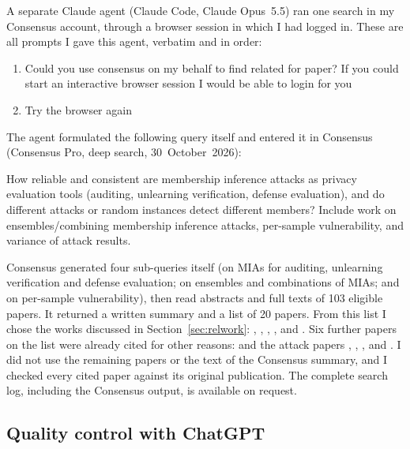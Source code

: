 \documentclass[a4paper]{article}
\newcommand{\prompt}[1]{{\raggedright\small\ttfamily\frenchspacing #1\par}}
\begin{document}
A separate Claude agent (Claude Code, Claude Opus~5.5) ran one search in my Consensus account, through a browser session in which I had logged in. These are all prompts I gave this agent, verbatim and in order:
\begin{enumerate}
  \item \prompt{Could you use consensus on my behalf to find related for paper? If you could start an interactive browser session I would be able to login for you}
  \item \prompt{Try the browser again}
\end{enumerate}
The agent formulated the following query itself and entered it in Consensus (Consensus Pro, deep search, 30~October~2026):
\prompt{How reliable and consistent are membership inference attacks as privacy evaluation tools (auditing, unlearning verification, defense evaluation), and do different attacks or random instances detect different members? Include work on ensembles/combining membership inference attacks, per-sample vulnerability, and variance of attack results.}
Consensus generated four sub-queries itself (on MIAs for auditing, unlearning verification and defense evaluation; on ensembles and combinations of MIAs; and on per-sample vulnerability), then read abstracts and full texts of 103 eligible papers.
It returned a written summary and a list of 20 papers.
From this list I chose the works discussed in Section~\ref{sec:relwork}: \citet{niu2025comparing}, \citet{jebreel2026revisiting}, \citet{hayes2024inexact}, \citet{jagielski2023combine}, \citet{ward2025ensembling} and \citet{hu2022survey}.
Six further papers on the list were already cited for other reasons: \citet{wang2025mia} and the attack papers \citet{shokri2017membership}, \citet{carlini2022membership}, \citet{choquette2021label}, \citet{ye2022enhanced} and \citet{liu2022membership}.
I did not use the remaining papers or the text of the Consensus summary, and I checked every cited paper against its original publication.
The complete search log, including the Consensus output, is available on request.

\subsection{Quality control with ChatGPT}
\label{app:chatgpt}
\end{document}
